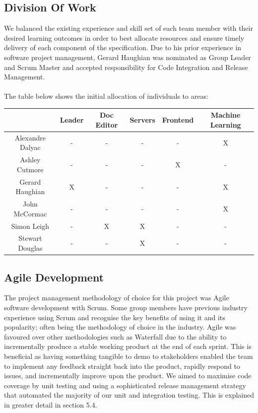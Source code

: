 \documentclass[a4paper,11pt]{article}
\begin{document}
\subsection{Division Of Work}

We balanced the existing experience and skill set of each team member with their desired learning outcomes in order to best allocate resources and ensure timely delivery of each component of the specification. Due to his prior experience in software project management, Gerard Haughian was nominated as Group Leader and Scrum Master and accepted responsibility for Code Integration and Release Management.
\\
\\
The table below shows the initial allocation of individuals to areas:
\\

\begin{tabular}{ c c c c c c }
  & Leader & Doc Editor & Servers & Frontend & Machine Learning \\
  \hline
  Alexandre Dalyac & - & - & - & - & X \\
  Ashley Cutmore & - & - & - & X & - \\
  Gerard Haughian & X & - & - & - & X \\
  John McCormac& - & - & - & - & X \\
  Simon Leigh & - & X & X & - & - \\
  Stewart Douglas& - & - & X & - & - \\
\end{tabular}


\subsection{Agile Development}

The project management methodology of choice for this project was Agile software development with Scrum. Some group members have previous industry experience using Scrum and recognise the key benefits of using it and its popularity; often being the methodology of choice in the industry. Agile was favoured over other methodologies such as Waterfall due to the ability to incrementally produce a stable working product at the end of each sprint. This is beneficial as having something tangible to demo to stakeholders enabled the team to implement any feedback straight back into the product, rapidly respond to issues, and incrementally improve upon the product. We aimed to maximise code coverage by unit testing and using a sophisticated release management strategy that automated the majority of our unit and integration testing. This is explained in greater detail in section 5.4. 
\end{document}
